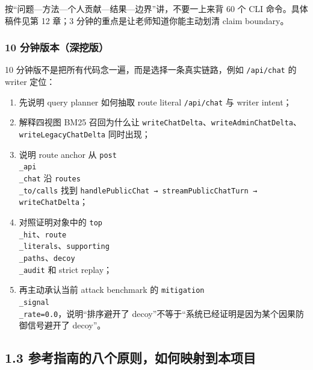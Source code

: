 \documentclass[UTF8,12pt,openany]{ctexbook}
\begin{document}
按“问题—方法—个人贡献—结果—边界”讲，不要一上来背 60 个 CLI 命令。具体稿件见第 12 章；3 分钟的重点是让老师知道你能主动划清 claim boundary。\par

\subsubsection{10 分钟版本（深挖版）}

10 分钟版不是把所有代码念一遍，而是选择一条真实链路，例如 \texttt{/api/chat} 的 writer 定位：\par

\begin{enumerate}
\item 先说明 query planner 如何抽取 route literal \texttt{/api/chat} 与 writer intent；
\item 解释四视图 BM25 召回为什么让 \texttt{writeChatDelta}、\texttt{writeAdminChatDelta}、\texttt{writeLegacyChatDelta} 同时出现；
\item 说明 route anchor 从 \texttt{post\\_api\\_chat} 沿 \texttt{routes\\_to/calls} 找到 \texttt{handlePublicChat → streamPublicChatTurn → writeChatDelta}；
\item 对照证明对象中的 \texttt{top\\_hit}、\texttt{route\\_literals}、\texttt{supporting\\_paths}、\texttt{decoy\\_audit} 和 strict replay；
\item 再主动承认当前 attack benchmark 的 \texttt{mitigation\\_signal\\_rate=0.0}，说明“排序避开了 decoy”不等于“系统已经证明是因为某个因果防御信号避开了 decoy”。
\end{enumerate}

\subsection{1.3 参考指南的八个原则，如何映射到本项目}
\end{document}
